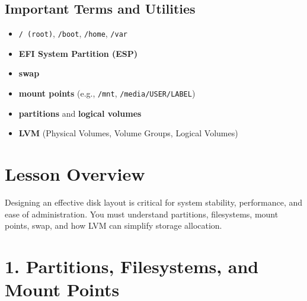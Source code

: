 \documentclass[12pt,a4paper]{report}
\begin{document}
\subsection*{Important Terms and Utilities}
\begin{itemize}
    \item \texttt{/ (root)}, \texttt{/boot}, \texttt{/home}, \texttt{/var}
    \item \textbf{EFI System Partition (ESP)}
    \item \textbf{swap}
    \item \textbf{mount points} (e.g., \texttt{/mnt}, \texttt{/media/USER/LABEL})
    \item \textbf{partitions} and \textbf{logical volumes}
    \item \textbf{LVM} (Physical Volumes, Volume Groups, Logical Volumes)
\end{itemize}

\section*{Lesson Overview}

Designing an effective disk layout is critical for system stability, performance, and ease of administration. You must understand partitions, filesystems, mount points, swap, and how LVM can simplify storage allocation.

\section*{1. Partitions, Filesystems, and Mount Points}
\end{document}
